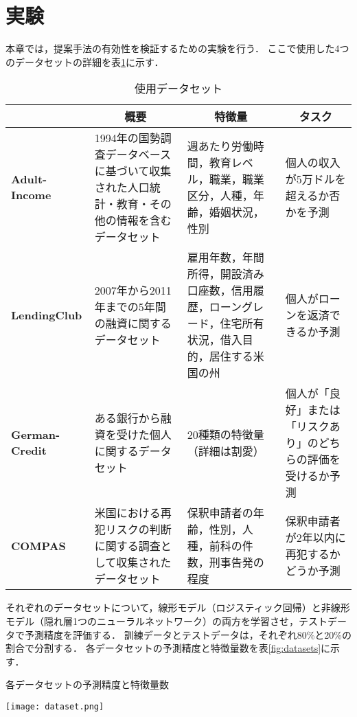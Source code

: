 \documentclass[dvipdfmx]{jreport}
\begin{document}
\section{実験}
本章では，提案手法の有効性を検証するための実験を行う．
ここで使用した4つのデータセットの詳細を表\ref{tab:datasets}に示す．
\begin{table}[h]
    \centering
    \caption{使用データセット}\label{tab:datasets}
    \begin{tabular}{|p{28mm}||p{40mm}|p{40mm}|p{40mm}|} \hline
        \rowcolor{gray!20}
        & \multicolumn{1}{c|}{\textbf{概要}} & \multicolumn{1}{c|}{\textbf{特徴量}} & \multicolumn{1}{c|}{\textbf{タスク}} \\ \hline 
        \textbf{Adult-Income} & 1994年の国勢調査データベースに基づいて収集された人口統計・教育・その他の情報を含むデータセット & 週あたり労働時間，教育レベル，職業，職業区分，人種，年齢，婚姻状況，性別 & 個人の収入が5万ドルを超えるか否かを予測 \\ \hline
        \textbf{LendingClub} & 2007年から2011年までの5年間の融資に関するデータセット & 雇用年数，年間所得，開設済み口座数，信用履歴，ローングレード，住宅所有状況，借入目的，居住する米国の州 & 個人がローンを返済できるか予測\\ \hline
        \textbf{German-Credit} & ある銀行から融資を受けた個人に関するデータセット & 20種類の特徴量（詳細は割愛） & 個人が「良好」または「リスクあり」のどちらの評価を受けるか予測 \\ \hline
        \textbf{COMPAS} & 米国における再犯リスクの判断に関する調査として収集されたデータセット & 保釈申請者の年齢，性別，人種，前科の件数，刑事告発の程度 & 保釈申請者が2年以内に再犯するかどうか予測 \\ \hline
    \end{tabular}
\end{table}

\newpage
それぞれのデータセットについて，線形モデル（ロジスティック回帰）と非線形モデル（隠れ層1つのニューラルネットワーク）の両方を学習させ，テストデータで予測精度を評価する．
訓練データとテストデータは，それぞれ80\%と20\%の割合で分割する．
各データセットの予測精度と特徴量数を表\ref{fig:datasets}に示す．

\begin{table}[h]
    \begin{center}
        \caption{各データセットの予測精度と特徴量数} \label{fig:datasets}
        \texttt{[image: dataset.png]} 
    \end{center}
\end{table}
\end{document}
